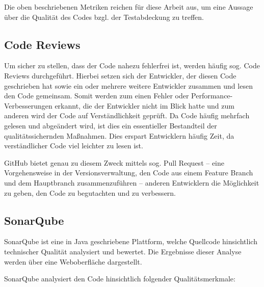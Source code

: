 				Die oben beschriebenen Metriken reichen für diese Arbeit aus, um eine Aussage über die Qualität des Codes bzgl. der Testabdeckung zu treffen. 
				
		\subsection{Code Reviews}
		
			Um sicher zu stellen, dass der Code nahezu fehlerfrei ist, werden häufig sog. Code Reviews durchgeführt. Hierbei setzen sich der Entwickler, der diesen Code geschrieben hat sowie ein oder mehrere weitere Entwickler zusammen und lesen den Code gemeinsam. Somit werden zum einen Fehler oder Performance-Verbesserungen erkannt, die der Entwickler nicht im Blick hatte und zum anderen wird der Code auf Verständlichkeit geprüft. Da Code häufig mehrfach gelesen und abgeändert wird, ist dies ein essentieller Bestandteil der qualitätssichernden Maßnahmen. Dies erspart Entwicklern häufig Zeit, da verständlicher Code viel leichter zu lesen ist.
			
			GitHub bietet genau zu diesem Zweck mittels sog. Pull Request -- eine Vorgehensweise in der Versionsverwaltung, den Code aus einem Feature Branch und dem Hauptbranch zusammenzuführen -- anderen Entwicklern die Möglichkeit zu geben, den Code zu begutachten und zu verbessern.			
		
		\subsection{SonarQube}
		\label{qm.sonarqube}
		
			SonarQube ist eine in Java geschriebene Plattform, welche Quellcode hinsichtlich technischer Qualität analysiert und bewertet. Die Ergebnisse dieser Analyse werden über eine Weboberfläche dargestellt. \cite{SonarSourceS.A.2142020} 
			
			SonarQube analysiert den Code hinsichtlich folgender Qualitätsmerkmale:
			
